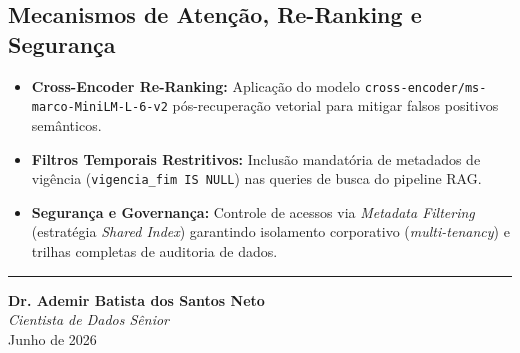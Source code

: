 \documentclass[12pt,a4paper]{article}
\begin{document}
\subsection{Mecanismos de Atenção, Re-Ranking e Segurança}
\begin{itemize}
    \item \textbf{Cross-Encoder Re-Ranking:} Aplicação do modelo \texttt{cross-encoder/ms-marco-MiniLM-L-6-v2} pós-recuperação vetorial para mitigar falsos positivos semânticos.
    \item \textbf{Filtros Temporais Restritivos:} Inclusão mandatória de metadados de vigência (\texttt{vigencia_fim IS NULL}) nas queries de busca do pipeline RAG.
    \item \textbf{Segurança e Governança:} Controle de acessos via \textit{Metadata Filtering} (estratégia \textit{Shared Index}) garantindo isolamento corporativo (\textit{multi-tenancy}) e trilhas completas de auditoria de dados.
\end{itemize}

\vspace{0.8cm}
\noindent\rule{\textwidth}{0.5pt}
\vspace{0.5cm}

\begin{flushright}
    \small
    \textbf{Dr. Ademir Batista dos Santos Neto} \\
    \textit{Cientista de Dados Sênior} \\
    Junho de 2026
\end{flushright}
\end{document}
